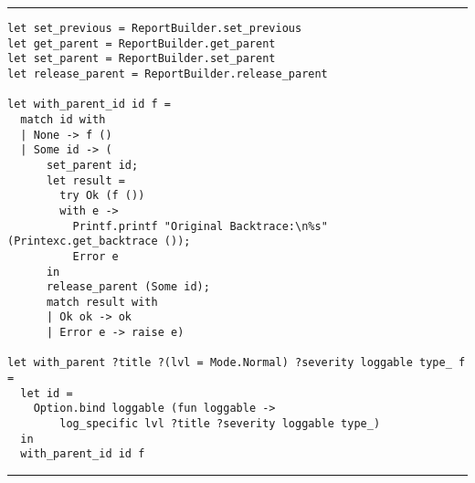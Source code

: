 \vspace{2em}
\noindent\rule{\textwidth}{0.5pt}
\vspace{-0.6cm}
\begin{verbatim}
let set_previous = ReportBuilder.set_previous
let get_parent = ReportBuilder.get_parent
let set_parent = ReportBuilder.set_parent
let release_parent = ReportBuilder.release_parent

let with_parent_id id f =
  match id with
  | None -> f ()
  | Some id -> (
      set_parent id;
      let result =
        try Ok (f ())
        with e ->
          Printf.printf "Original Backtrace:\n%s" (Printexc.get_backtrace ());
          Error e
      in
      release_parent (Some id);
      match result with
      | Ok ok -> ok
      | Error e -> raise e)

let with_parent ?title ?(lvl = Mode.Normal) ?severity loggable type_ f =
  let id =
    Option.bind loggable (fun loggable ->
        log_specific lvl ?title ?severity loggable type_)
  in
  with_parent_id id f
\end{verbatim}
\vspace{-0.4cm}
\noindent\rule{\textwidth}{0.5pt}
\vspace{-0.6cm}
\label{lst:logging-parent-previous}

